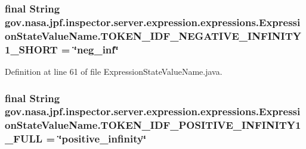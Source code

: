\subsubsection[{\texorpdfstring{T\+O\+K\+E\+N\+\_\+\+I\+D\+F\+\_\+\+N\+E\+G\+A\+T\+I\+V\+E\+\_\+\+I\+N\+F\+I\+N\+I\+T\+Y1\+\_\+\+S\+H\+O\+RT}{TOKEN_IDF_NEGATIVE_INFINITY1_SHORT}}]{\setlength{\rightskip}{0pt plus 5cm}final String gov.\+nasa.\+jpf.\+inspector.\+server.\+expression.\+expressions.\+Expression\+State\+Value\+Name.\+T\+O\+K\+E\+N\+\_\+\+I\+D\+F\+\_\+\+N\+E\+G\+A\+T\+I\+V\+E\+\_\+\+I\+N\+F\+I\+N\+I\+T\+Y1\+\_\+\+S\+H\+O\+RT = \char`\"{}neg\+\_\+inf\char`\"{}\hspace{0.3cm}{\ttfamily [static]}}\hypertarget{classgov_1_1nasa_1_1jpf_1_1inspector_1_1server_1_1expression_1_1expressions_1_1_expression_state_value_name_a8cc1388ff14522512a25789a8b5c85d5}{}\label{classgov_1_1nasa_1_1jpf_1_1inspector_1_1server_1_1expression_1_1expressions_1_1_expression_state_value_name_a8cc1388ff14522512a25789a8b5c85d5}


Definition at line 61 of file Expression\+State\+Value\+Name.\+java.

\subsubsection[{\texorpdfstring{T\+O\+K\+E\+N\+\_\+\+I\+D\+F\+\_\+\+P\+O\+S\+I\+T\+I\+V\+E\+\_\+\+I\+N\+F\+I\+N\+I\+T\+Y1\+\_\+\+F\+U\+LL}{TOKEN_IDF_POSITIVE_INFINITY1_FULL}}]{\setlength{\rightskip}{0pt plus 5cm}final String gov.\+nasa.\+jpf.\+inspector.\+server.\+expression.\+expressions.\+Expression\+State\+Value\+Name.\+T\+O\+K\+E\+N\+\_\+\+I\+D\+F\+\_\+\+P\+O\+S\+I\+T\+I\+V\+E\+\_\+\+I\+N\+F\+I\+N\+I\+T\+Y1\+\_\+\+F\+U\+LL = \char`\"{}positive\+\_\+infinity\char`\"{}\hspace{0.3cm}{\ttfamily [static]}}\hypertarget{classgov_1_1nasa_1_1jpf_1_1inspector_1_1server_1_1expression_1_1expressions_1_1_expression_state_value_name_a5e99cc072b02b6bb4be6e8179eae5d9b}{}\label{classgov_1_1nasa_1_1jpf_1_1inspector_1_1server_1_1expression_1_1expressions_1_1_expression_state_value_name_a5e99cc072b02b6bb4be6e8179eae5d9b}


